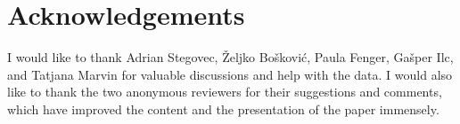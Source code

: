 \documentclass[output=paper,
modfonts,nonflat,
newtxmath
]{langsci/langscibook}
\begin{document}
\section*{Acknowledgements}
I would like to thank Adrian Stegovec, Željko Bošković, Paula Fenger, Gašper Ilc, and Tatjana Marvin for valuable discussions and help with the data. I would also like to thank the two anonymous reviewers for their suggestions and comments, which have improved the content and the presentation of the paper immensely.

\sloppy
\printbibliography[heading=subbibliography,notkeyword=this]
\end{document}
